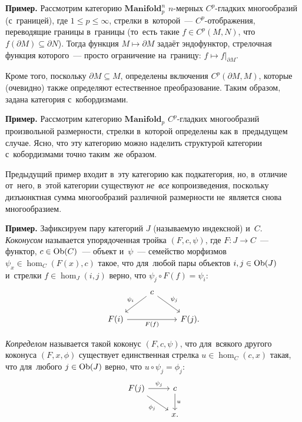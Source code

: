 \documentclass[a4paper,oneside]{article}
\begin{document}
\medskip
\noindent\textbf{Пример.} Рассмотрим категорию $\mathbf{Manifold}_p^n$ $n$-мерных $C^p$-гладких многообразий (с~границей),
где $1 \leq p \leq \infty$, стрелки в~которой~— $C^p$-отображения, переводящие границы в~границы (то~есть такие $f \in C^p(M, N)$,
что $f(\partial M) \subseteq \partial N$). Тогда функция $M \mapsto \partial M$ задаёт эндофунктор,
стрелочная функция которого~— просто ограничение на~границу: $f \mapsto f|_{\partial M}$.

Кроме того, поскольку $\partial M \subseteq M$, определены включения $C^p(\partial M, M)$,
которые (очевидно) также определяют естественное преобразование. Таким образом, задана категория с~кобордизмами.
\medskip

\noindent\textbf{Пример.} Рассмотрим категорию $\mathbf{Manifold}_p$ $C^p$-гладких многообразий произвольной размерности,
стрелки в~которой определены как в~предыдущем случае. Ясно, что эту категорию можно наделить структурой
категории с~кобордизмами точно таким~же образом.

Предыдущий пример входит в~эту категорию как подкатегория, но, в~отличие от~него, в~этой категории
существуют \textit{не~все} копроизведения, поскольку дизъюнктная сумма многообразий различной размерности
не~является снова многообразием.
\medskip

\noindent\textbf{Пример.} Зафиксируем пару категорий $J$ (называемую индексной) и~$C$. \textit{Коконусом} называется упорядоченная
тройка $(F, c, \psi)$, где $F : J \rightarrow C$~— функтор, $c \in \mathrm{Ob}(C)$~— объект
и~$\psi$~— семейство морфизмов $\psi_x \in \hom_C(F(x), c)$ такое, что для~любой
пары объектов $i, j \in \mathrm{Ob}(J)$ и~стрелки $f \in \hom_J(i, j)$ верно,
что $\psi_j \circ F(f) = \psi_i$:
\[
    \begin{tikzcd}
        &                               & \arrow{ld}{}[swap]{\psi_i} c \arrow{rd}{\psi_j} &       & \\
        & F(i) \arrow{rr}{}[swap]{F(f)} &                                                 & F(j). &
    \end{tikzcd}
\]

\textit{Копределом} называется такой коконус $(F, c, \psi)$, что для~всякого другого коконуса $(F, x, \phi)$
существует единственная стрелка $u \in \hom_C(c, x)$ такая, что для~любого $j \in \mathrm{Ob}(J)$
верно, что $u \circ \psi_j = \phi_j$:
\[
    \begin{tikzcd}
        F(j) \arrow{r}{\psi_j} \arrow{dr}{}[swap]{\phi_j} & \arrow{d}{u} c \\
                                                          & x.
    \end{tikzcd}
\]
\end{document}
